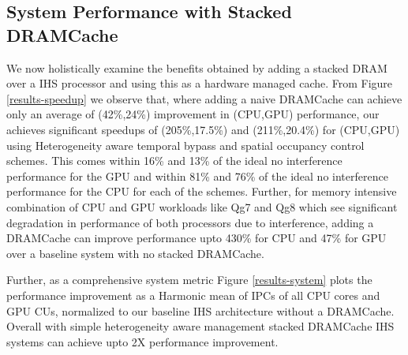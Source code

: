 \subsection{System Performance with Stacked DRAMCache}
We now holistically examine the benefits obtained by adding a stacked DRAM over a IHS processor and using this as a hardware managed cache. From Figure \ref{results-speedup} we observe that, where adding a naive DRAMCache can achieve only an average of (42\%,24\%) improvement in (CPU,GPU) performance, our \cachename achieves significant speedups of (205\%,17.5\%) and (211\%,20.4\%) for (CPU,GPU) using Heterogeneity aware temporal bypass and spatial occupancy control schemes. This comes within 16\% and 13\% of the ideal no interference performance for the GPU and within 81\% and 76\% of the ideal no interference performance for the CPU for each of the schemes. Further, for memory intensive combination of CPU and GPU workloads like Qg7 and Qg8 which see significant degradation in performance of both processors due to interference, adding a DRAMCache can improve performance upto 430\% for CPU and 47\% for GPU over a baseline system with no stacked DRAMCache.
\par Further, as a comprehensive system metric Figure \ref{results-system} plots the performance improvement as a Harmonic mean of IPCs of all CPU cores and GPU CUs, normalized to our baseline IHS architecture without a DRAMCache. Overall with simple heterogeneity aware management stacked DRAMCache IHS systems can achieve upto 2X performance improvement.